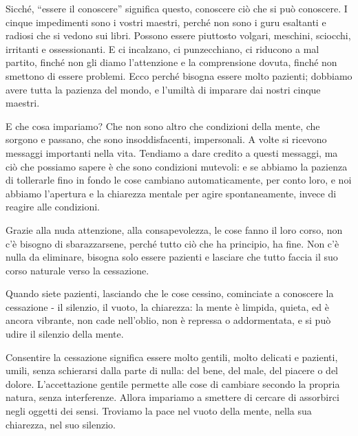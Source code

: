 Sicché, ``essere il conoscere” significa questo, conoscere ciò che si può
conoscere. I cinque impedimenti sono i vostri maestri, perché non sono i
guru esaltanti e radiosi che si vedono sui libri. Possono essere
piuttosto volgari, meschini, sciocchi, irritanti e ossessionanti. E ci
incalzano, ci punzecchiano, ci riducono a mal partito, finché non gli
diamo l'attenzione e la comprensione dovuta, finché non smettono di
essere problemi. Ecco perché bisogna essere molto pazienti; dobbiamo
avere tutta la pazienza del mondo, e l'umiltà di imparare dai nostri
cinque maestri.

E che cosa impariamo? Che non sono altro che condizioni della mente, che
sorgono e passano, che sono insoddisfacenti, impersonali. A volte si
ricevono messaggi importanti nella vita. Tendiamo a dare credito a
questi messaggi, ma ciò che possiamo sapere è che sono condizioni
mutevoli: e se abbiamo la pazienza di tollerarle fino in fondo le cose
cambiano automaticamente, per conto loro, e noi abbiamo l'apertura e la
chiarezza mentale per agire spontaneamente, invece di reagire alle
condizioni.

Grazie alla nuda attenzione, alla consapevolezza, le cose fanno il loro
corso, non c'è bisogno di sbarazzarsene, perché tutto ciò che ha
principio, ha fine. Non c'è nulla da eliminare, bisogna solo essere
pazienti e lasciare che tutto faccia il suo corso naturale verso la
cessazione.

Quando siete pazienti, lasciando che le cose cessino, cominciate a
conoscere la cessazione - il silenzio, il vuoto, la chiarezza: la mente
è limpida, quieta, ed è ancora vibrante, non cade nell'oblio, non è
repressa o addormentata, e si può udire il silenzio della mente.

Consentire la cessazione significa essere molto gentili, molto delicati
e pazienti, umili, senza schierarsi dalla parte di nulla: del bene, del
male, del piacere o del dolore. L'accettazione gentile permette alle
cose di cambiare secondo la propria natura, senza interferenze. Allora
impariamo a smettere di cercare di assorbirci negli oggetti dei sensi.
Troviamo la pace nel vuoto della mente, nella sua chiarezza, nel suo
silenzio.

